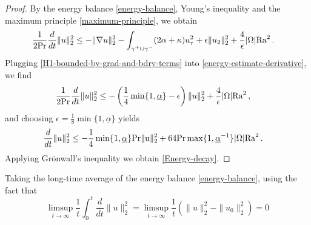 \documentclass{article}
\theoremstyle{definition}
\theoremstyle{definition}
\newcommand{\Pra}{\rm{Pr}}
\newcommand{\Ra}{{\rm{Ra}}}
\begin{document}
\begin{proof}
By the energy balance \eqref{energy-balance}, Young's inequality
 and the maximum principle \eqref{maximum-principle}, we obtain
\begin{align}
    \label{energy-estimate-derivative}
    \frac{1}{2 \Pra} \frac{d}{dt}\|u\|_2^2 
    &\leq -\|\nabla u\|_2^2 - \int_{\gamma^+\cup \gamma^-} (2\alpha+\kappa) u_\tau^2 + \epsilon \|u_2\|_2^2 + \frac{4}{\epsilon}|\Omega|\Ra^2\,.
\end{align}
Plugging \eqref{H1-bounded-by-grad-and-bdry-terms} into \eqref{energy-estimate-derivative}, we find
\begin{align*}
    \frac{1}{2 \Pra} \frac{d}{dt}\|u\|_2^2 
    &\leq -\left(\frac{1}{4}\min\lbrace 1, \underline{\alpha}\rbrace -\epsilon\right) \|u\|_2^2 + \frac{4}{\epsilon}|\Omega|\Ra^2\,,
\end{align*}
and choosing $\epsilon=\frac{1}{8}\min\lbrace 1, \underline{\alpha}\rbrace$ yields
\begin{align*}
    \frac{d}{dt}\|u\|_2^2 
    &\leq -\frac{1}{4}\min\lbrace 1, \underline{\alpha}\rbrace \Pra  \|u\|_2^2 + 64 \Pra \max \lbrace 1, \underline{\alpha}^{-1}\rbrace |\Omega|\Ra^2\,.
\end{align*}
Applying Gr\"onwall's inequality we obtain \eqref{Energy-decay}.
\end{proof}
Taking the long-time average of the energy balance \eqref{energy-balance}, using the fact that
    $$\limsup_{t\to\infty}\frac{1}{t}\int_0^t \frac{d}{dt}\|u\|_2^2 = \limsup_{t\to\infty}\frac{1}{t}\left(\|u\|_2^2-\|u_0\|_2^2\right)=0$$
\end{document}
